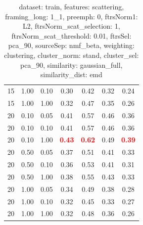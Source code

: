 \documentclass[12pt,a4paper,fleqn]{tufte-handout}
\begin{document}
\begin{table}
\begin{center}
\begin{tabular}{lllcccc}
15 & 1.00 & 0.10 & 0.30 & 0.42 & 0.32 & 0.24 \\  
15 & 1.00 & 1.00 & 0.32 & 0.47 & 0.35 & 0.26 \\  
20 & 0.10 & 0.05 & 0.41 & 0.57 & 0.46 & 0.36 \\  
20 & 0.10 & 0.10 & 0.41 & 0.57 & 0.46 & 0.36 \\  
20 & 0.10 & 1.00 & \textbf{\textcolor{red}{0.43}} & \textbf{\textcolor{red}{0.62}} & 0.49 & \textbf{\textcolor{red}{0.39}} \\  
20 & 0.50 & 0.05 & 0.37 & 0.51 & 0.41 & 0.33 \\  
20 & 0.50 & 0.10 & 0.36 & 0.53 & 0.41 & 0.31 \\  
20 & 0.50 & 1.00 & 0.38 & 0.55 & 0.43 & 0.33 \\  
20 & 1.00 & 0.05 & 0.34 & 0.49 & 0.38 & 0.28 \\  
20 & 1.00 & 0.10 & 0.32 & 0.45 & 0.33 & 0.27 \\  
20 & 1.00 & 1.00 & 0.32 & 0.48 & 0.36 & 0.26 \\  
\end{tabular}  
\end{center}  
\caption{dataset: train, features: scattering, framing\_long: 1\_1, preemph: 0, ftrsNorm1: L2, ftrsNorm\_scat\_selection: 1, ftrsNorm\_scat\_threshold: 0.01, ftrsSel: pca\_90, sourceSep: nmf\_beta, weighting: clustering, cluster\_norm: stand, cluster\_sel: pca\_90, similarity: gaussian\_full, similarity\_dist: emd}  
\label{datasetrFeaturscFraminlong1_1Preemp0Ftrsnorm1L2Ftrsnoscatselect1Ftrsnoscatthresh0.01Ftrsselpc90SourcesepnmbeWeightclClustenormstClusteselpc90SimilagafuSimiladistem}  
\end{table}  
 
\end{document}
